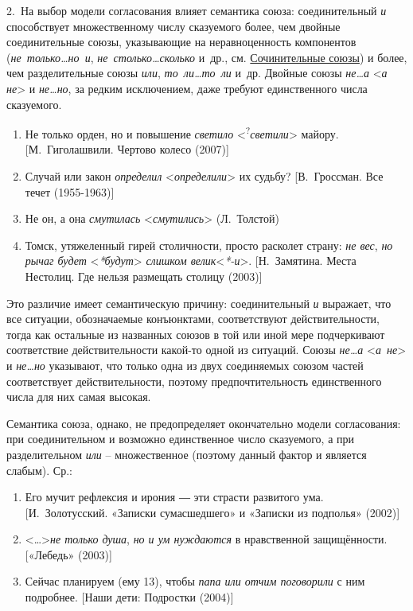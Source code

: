 2.~На выбор модели согласования влияет семантика союза: соединительный
\emph{и} способствует множественному числу сказуемого более, чем двойные
соединительные союзы, указывающие на неравноценность компонентов
(\emph{не~только\ldots но~и}, \emph{не~столько\ldots сколько} и~др., см.
\underline{Сочинительные союзы}) и более, чем разделительные союзы
\emph{или}, \emph{то~ли\ldots то~ли} и~др. Двойные союзы
\emph{не\ldots а} \textless{}\emph{а не}\textgreater{} и
\emph{не\ldots но}, за редким исключением, даже требуют единственного
числа сказуемого.

\begin{enumerate}
\def\labelenumi{(\arabic{enumi})}
\setcounter{enumi}{101}
\item
  Не только орден, но и повышение \emph{светило}
  \textless{}\textsuperscript{?}\emph{светили}\textgreater{} майору.
  {[}М.~Гиголашвили. Чертово колесо (2007){]}
\item
  Случай или закон \emph{определил}
  \textless*\emph{определили}\textgreater{} их судьбу? {[}В.~Гроссман.
  Все течет (1955-1963){]}
\item
  Не он, а она \emph{смутилась} \textless*\emph{смутились}\textgreater{}
  (Л.~Толстой)
\item
  Томск, утяжеленный гирей столичности, просто расколет страну: \emph{не
  вес}, \emph{но рычаг будет} \textless{}\emph{*будут}\textgreater{}
  \emph{слишком велик}\textless{}\emph{*-и}\textgreater. {[}Н.~Замятина.
  Места Нестолиц. Где нельзя размещать столицу (2003){]}
\end{enumerate}

Это различие имеет семантическую причину: соединительный \emph{и}
выражает, что все ситуации, обозначаемые конъюнктами, соответствуют
действительности, тогда как остальные из названных союзов в той или иной
мере подчеркивают соответствие действительности какой-то одной из
ситуаций. Союзы \emph{не\ldots а} \textless{}\emph{а~не}\textgreater{} и
\emph{не\ldots но} указывают, что только одна из двух соединяемых союзом
частей соответствует действительности, поэтому предпочтительность
единственного числа для них самая высокая.

Семантика союза, однако, не предопределяет окончательно модели
согласования: при соединительном и возможно единственное число
сказуемого, а при разделительном \emph{или} -- множественное (поэтому
данный фактор и является слабым). Ср.:

\begin{enumerate}
\def\labelenumi{(\arabic{enumi})}
\setcounter{enumi}{105}
\item
  Его мучит рефлексия и ирония ― эти страсти развитого ума.
  {[}И.~Золотусский. «Записки сумасшедшего» и «Записки из подполья»
  (2002){]}
\item
  \textless\ldots\textgreater{}\emph{не только душа}, \emph{но и ум
  нуждаются} в нравственной защищённости. {[}«Лебедь» (2003){]}
\item
  Сейчас планируем (ему 13), чтобы \emph{папа или отчим поговорили} с
  ним подробнее. {[}Наши дети: Подростки (2004){]}
\end{enumerate}

